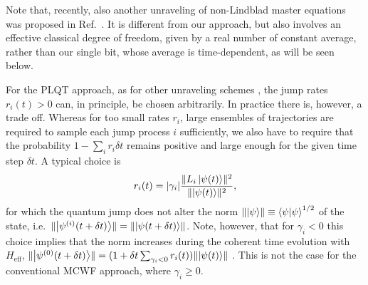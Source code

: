 \documentclass[twocolumn,prl,superscriptaddress]{revtex4-2}
\renewcommand{\i}{\mathrm i}
\begin{document}
Note that, recently, also another unraveling of non-Lindblad master equations was proposed in Ref.~\cite{DonvilMGinanneschi2022}. It is different from our approach, but also involves an effective classical degree of freedom, given by a real number of constant average, rather than our single bit, whose average is time-dependent, as will be seen below. 

For the PLQT approach, as for other unraveling schemes \cite{IKondovMschreiber2003}, the jump rates $r_i(t) > 0$ can, in principle, be chosen arbitrarily. In practice there is, however, a trade off. Whereas for too small rates $r_i$, large ensembles of trajectories are required to sample each jump process $i$ sufficiently, we also have to require that the probability $1- \sum_i r_i\delta t$ remains positive and large enough for the given time step $\delta t$. A typical choice is \cite{ADaley2014}
\begin{align}
	r_i(t) = |\gamma_i| \frac{\lVert L_i \ket{\psi (t)} \rVert^2}{\lVert \ket{\psi(t)} \rVert^2},
	\label{eq:jump_prob}
\end{align} 
for which the quantum jump does not alter the norm $\lVert \ket \psi \rVert\equiv \braket{\psi}^{1/2}$ of the state, i.e.~$\lVert \ket{\psi^{(i)}(t+\delta t)} \rVert = \lVert \ket{\psi(t+\delta t)}\rVert$. Note, however, that for $\gamma_i<0$ this choice implies that the norm increases during the coherent time evolution with $H_\mathrm{eff}$,  $\lVert \ket{\psi^{(0)}(t+\delta t)} \rVert = (1 + \delta t \sum_{\gamma_i<0} r_i(t))  \lVert \ket{\psi(t)} \rVert$ \cite{footnote_norm}. %
This is not the case for the conventional MCWF approach, where $\gamma_i\ge0$.
\end{document}

